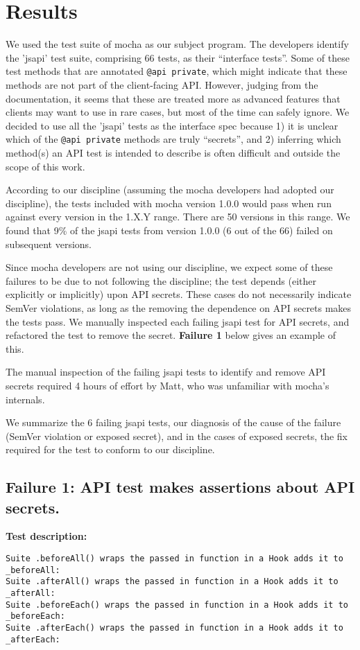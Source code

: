 \section{Results}
We used the test suite of mocha as our subject program. The developers
identify the 'jsapi' test suite, comprising 66 tests, as their
``interface tests''. Some of these test methods that are annotated
{\tt @api private}, which might indicate that these methods are not
part of the client-facing API. However, judging from the
documentation, it seems that these are treated more as advanced
features that clients may want to use in rare cases, but most of the
time can safely ignore. We decided to use all the 'jsapi' tests as the
interface spec because 1) it is unclear which of the {\tt @api
  private} methods are truly ``secrets'', and 2) inferring which
method(s) an API test is intended to describe is often difficult and
outside the scope of this work.

According to our discipline (assuming the mocha developers had adopted
our discipline), the tests included with mocha version 1.0.0 would
pass when run against every version in the 1.X.Y range. There are 50
versions in this range. We found that 9\% of the jsapi tests from
version 1.0.0 (6 out of the 66) failed on subsequent versions.

Since mocha developers are not using our discipline, we expect some of
these failures to be due to not following the discipline; the test
depends (either explicitly or implicitly) upon API secrets. These
cases do not necessarily indicate SemVer violations, as long as the
removing the dependence on API secrets makes the tests pass. We
manually inspected each failing jsapi test for API secrets, and
refactored the test to remove the secret. {\bf Failure 1} below gives
an example of this.

The manual inspection of the failing jsapi tests to identify and
remove API secrets required 4 hours of effort by Matt, who was
unfamiliar with mocha's internals.

We summarize the 6 failing jsapi tests, our diagnosis of the cause of
the failure (SemVer violation or exposed secret), and in the cases of
exposed secrets, the fix required for the test to conform to our
discipline.

\subsection{Failure 1: API test makes assertions about API secrets.}
{\bf Test description: }
\begin{verbatim}
Suite .beforeAll() wraps the passed in function in a Hook adds it to _beforeAll:
Suite .afterAll() wraps the passed in function in a Hook adds it to _afterAll:
Suite .beforeEach() wraps the passed in function in a Hook adds it to _beforeEach:
Suite .afterEach() wraps the passed in function in a Hook adds it to _afterEach:
\end{verbatim}

